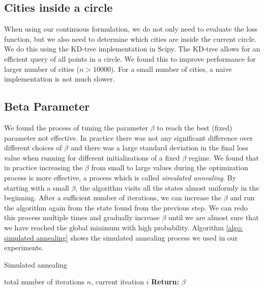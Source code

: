 \documentclass[conference,compsoc]{IEEEtran}
\begin{document}
\subsection{Cities inside a circle}
When using our continuous formulation, we do not only need to evaluate the loss
function, but we also need to determine which cities are inside the current
circle. We do this using the KD-tree implementation in Scipy. The KD-tree allows
for an efficient query of all points in a circle. We found this to improve
performance for larger number of cities ($n > 10000$). For a small number of
cities, a naive implementation is not much slower.


\subsection{Beta Parameter}
We found the process of tuning the parameter $\beta$ to reach the best (fixed)
parameter not effective. In practice there was not any significant difference
over different choices of $\beta$ and there was a large standard deviation in
the final loss value when running for different initializations of a fixed
$\beta$ regime. We found that in practice increasing the $\beta$ from small to
large values during the optimization process is more effective, a process which
is called \textit{simulated annealing}. By starting with a small $\beta$, the
algorithm visits all the states almost uniformly in the beginning. After a
sufficient number of iterations, we can increase the $\beta$ and run the
algorithm again from the state found from the previous step. We can redo this
process multiple times and gradually increase $\beta$ until we are almost sure
that we have reached the global minimum with high probability. Algorithm
\ref{algo: simulated annealing} shows the simulated annealing process we used in
our experiments.
\begin{algorithm}[htb]
   \caption{Simulated annealing}
   \label{algo: simulated annealing}
\begin{algorithmic}
    total number of iterations $n$, current iteation
   $i$   
        \ELSE {}\ENDIF \STATE
   {\bfseries Return:} $\beta$
\end{algorithmic}
\end{algorithm}
\end{document}
